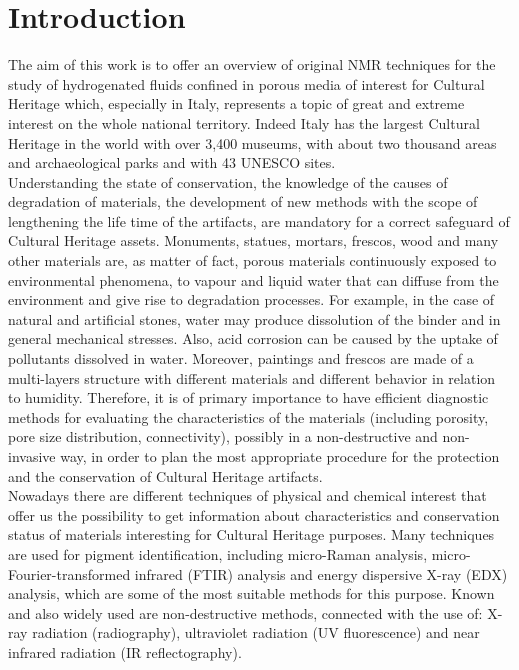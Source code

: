 \documentclass[a4paper,11pt]{report}
\begin{document}
\chapter{Introduction}
The aim of this work is to offer an overview of original NMR techniques for the study of hydrogenated fluids confined in porous media of interest for Cultural Heritage which, especially in Italy, represents a topic of great and extreme interest on the whole national territory. Indeed Italy has the largest Cultural Heritage in the world with over 3,400 museums, with about two thousand areas and archaeological parks and with 43 UNESCO sites\cite{dieci}.\\ 
Understanding the state of conservation, the knowledge of the causes of degradation of materials, the development of new methods with the scope of lengthening the life time of the artifacts, are mandatory for a correct safeguard of Cultural Heritage assets. Monuments, statues, mortars, frescos, wood and many other materials are, as matter of fact, porous materials continuously exposed to environmental phenomena, to vapour and liquid water that can diffuse from the environment and give rise to degradation processes. For example, in the case of natural and artificial stones, water may produce dissolution of the binder and in general mechanical stresses. Also, acid corrosion can be caused by the uptake of pollutants dissolved in water. Moreover, paintings and frescos are made of a multi-layers structure with different materials and different behavior in relation to humidity. Therefore, it is of primary importance to have efficient diagnostic methods for evaluating the characteristics of the materials (including porosity, pore size distribution, connectivity), possibly in a non-destructive and non-invasive way, in order to plan the most appropriate procedure for the protection and the conservation of Cultural Heritage artifacts\cite{quattro}.\\
Nowadays there are different techniques of physical and chemical interest that offer us the possibility to get information about characteristics and conservation status  of materials interesting for  Cultural Heritage purposes. Many techniques are used for pigment identification, including micro-Raman analysis, micro-Fourier-transformed infrared (FTIR) analysis and energy dispersive X-ray (EDX) analysis, which are some of the most suitable methods for this purpose\cite{sette}. Known and also widely used are non-destructive methods, connected with the use of:  X-ray radiation (radiography), ultraviolet radiation (UV fluorescence) and near infrared radiation (IR reflectography)\cite{otto}.\\
\end{document}
